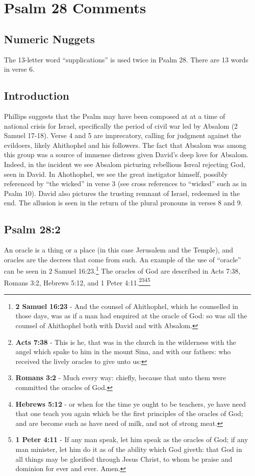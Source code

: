 \section{Psalm 28 Comments}

\subsection{Numeric Nuggets}
The 13-letter word ``supplications'' is used twice in Psalm 28. There are 13 words in  verse 6.

\subsection{Introduction}
Phillips suggests that the Psalm may have been composed at at a time of  national crisis for Israel, specifically the period of civil war led by Absalom (2 Samuel 17-18). Verse 4 and 5 are imprecatory, calling for judgment against the evildoers, likely Ahithophel and his followers. The fact that Absalom was among this group was a source of immense distress given David's deep love for Absalom. Indeed, in the incident we see Absalom picturing rebellious Isreal rejecting God, seen in David. In Ahothophel, we see the great instigator himself, possibly referenced by ``the wicked'' in verse  3 (see cross references to ``wicked'' such as in Psalm 10). David also pictures the trusting remnant of Israel, redeemed in the end. The allusion is seen in the return of the plural pronouns in verses 8 and 9.  \cite{Phillips2001ExploringPsalms1} 

\subsection{Psalm 28:2}
An oracle is a thing or a place (in this case Jerusalem and the Temple), and oracles are the decrees that come from such. An example of the use of ``oracle'' can be seen in  2 Samuel 16:23.\footnote{\textbf{2 Samuel 16:23} - And the counsel of Ahithophel, which he counselled in those days, was as if a man had enquired at the oracle of God: so was all the counsel of Ahithophel both with David and with Absalom.} The oracles of God are described in Acts 7:38, Romans 3:2, Hebrews 5:12, and 1 Peter 4:11.\footnote{\textbf{Acts 7:38} - This is he, that was in the church in the wilderness with the angel which spake to him in the mount Sina, and with our fathers: who received the lively oracles to give unto us:}\footnote{\textbf{Romans 3:2} -  Much every way: chiefly, because that unto them were committed the oracles of God.}\footnote{\textbf{Hebrews 5:12} - or when for the time ye ought to be teachers, ye have need that one teach you again which be the first principles of the oracles of God; and are become such as have need of milk, and not of strong meat.}\footnote{\textbf{1 Peter 4:11} - If any man speak, let him speak as the oracles of God; if any man minister, let him do it as of the ability which God giveth: that God in all things may be glorified through Jesus Christ, to whom be praise and dominion for ever and ever. Amen.}

